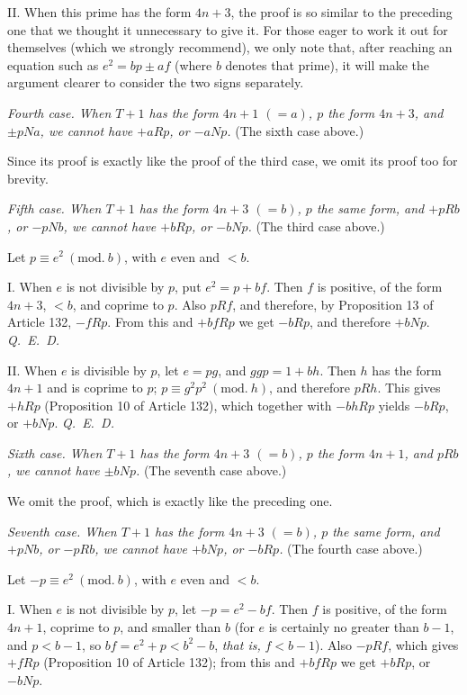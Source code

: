 II. When this prime has the form $4n+3$, the proof is so similar to the preceding one that we thought it unnecessary to give it. For those eager to work it out for themselves (which we strongly recommend), we only note that, after reaching an equation such as $e^2=bp\pm af$ (where $b$ denotes that prime), it will make the argument clearer to consider the two signs separately.

\textit{Fourth case. When $T+1$ has the form $4n+1$ $(=a)$, $p$ the form $4n+3$, and $\pm pNa$, we cannot have $+aRp$, or $-aNp$.} (The sixth case above.)

Since its proof is exactly like the proof of the third case, we omit its proof too for brevity.

\textit{Fifth case. When $T+1$ has the form $4n+3$ $(=b)$, $p$ the same form, and $+pRb$, or $-pNb$, we cannot have $+bRp$, or $-bNp$.} (The third case above.)

Let $p\equiv e^2\ (\mathrm{mod.}\ b)$, with $e$ even and $<b$.

I. When $e$ is not divisible by $p$, put $e^2=p+bf$. Then $f$ is positive, of the form $4n+3$, $<b$, and coprime to $p$. Also $pRf$, and therefore, by Proposition 13 of Article 132, $-fRp$. From this and $+bfRp$ we get $-bRp$, and therefore $+bNp$. \mbox{\textit{Q. E. D.}}

II. When $e$ is divisible by $p$, let $e=pg$, and $ggp=1+bh$. Then $h$ has the form $4n+1$ and is coprime to $p$; $p\equiv g^2p^2\ (\mathrm{mod.}\ h)$, and therefore $pRh$. This gives $+hRp$ (Proposition 10 of Article 132), which together with $-bhRp$ yields $-bRp$, or $+bNp$. \mbox{\textit{Q. E. D.}}

\textit{Sixth case. When $T+1$ has the form $4n+3$ $(=b)$, $p$ the form $4n+1$, and $pRb$, we cannot have $\pm bNp$.} (The seventh case above.)

We omit the proof, which is exactly like the preceding one.

\textit{Seventh case. When $T+1$ has the form $4n+3$ $(=b)$, $p$ the same form, and $+pNb$, or $-pRb$, we cannot have $+bNp$, or $-bRp$.} (The fourth case above.)

Let $-p\equiv e^2\ (\mathrm{mod.}\ b)$, with $e$ even and $<b$.

I. When $e$ is not divisible by $p$, let $-p=e^2-bf$. Then $f$ is positive, of the form $4n+1$, coprime to $p$, and smaller than $b$ (for $e$ is certainly no greater than $b-1$, and $p<b-1$, so $bf=e^2+p<b^2-b$, \textit{that is,} $f<b-1$). Also $-pRf$, which gives $+fRp$ (Proposition 10 of Article 132); from this and $+bfRp$ we get $+bRp$, or $-bNp$.

